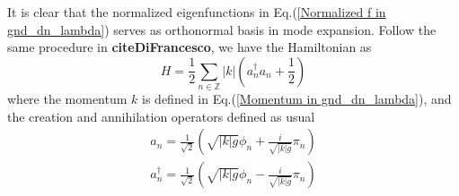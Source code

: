 \begin{comment}
Thus, the normalized eigenfunctions are
\begin{equation}
f_n(x) = \sqrt{\frac{2}{L}}
\left\lbrace
\begin{aligned}
  \cos(kx +\frac{1}{2}kL ) &  \quad x < 0  \\
  \pm \sin(kx - \frac{1}{2}kL ) & \quad x > 0   \\
\end{aligned} \right. 
\qquad 
k = \frac{2\pi}{L}( n \pm  \frac{\theta}{\pi} )  \quad n \in \mathbb{Z} 
\end{equation}
Expand the field $\phi = \sum_n \phi_n f_n(x) $, the action and Hamiltonian becomes
\begin{equation}
  S = \frac{g}{2} \int dt \, \sum_{n \in \mathbb{Z} }\left(  \dot{\phi}^2_n + k^2 \phi_n^2 \right) \implies\quad   g \dot{\phi}_n  = \pi_n \quad \implies H =  
\frac{1}{2g}\sum_{n \in \mathbb{Z} } \pi_n^2 + ( kg )^2  \phi_n^2 
\end{equation}
\end{comment}

It is clear that the normalized eigenfunctions in Eq.(\ref{Normalized f in gnd_dn_lambda}) serves as orthonormal basis in mode expansion. Follow the same procedure in {\bf\color{red}citeDiFrancesco}, we have the Hamiltonian as
\begin{equation}
\label{H in gnd_dn_lambda}
H = \frac{1}{2} \sum_{n \in \mathbb{Z} } |k|  (a^{\dagger}_n a_n + \frac{1}{2} )
\end{equation}
where the momentum $k$ is defined in Eq.(\ref{Momentum in gnd_dn_lambda}), and the creation and annihilation operators defined as usual
\begin{equation}
\begin{aligned}
a_n = \frac{1}{\sqrt{2}} ( \sqrt{ |k|g} \phi_n + \frac{i }{\sqrt{|k|g} }\pi_n  ) \\
a^{\dagger}_n = \frac{1}{\sqrt{2}} ( \sqrt{ |k|g} \phi_n - \frac{i }{\sqrt{|k|g} }\pi_n  ) \\
\end{aligned}
\end{equation}

